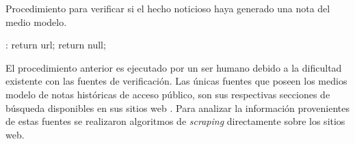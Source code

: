 \begin{algorithm}[H]
	\caption{Procedimiento para verificar si el hecho noticioso haya generado una nota del medio modelo.}
	\label{pchaveLink}
	\begin{algorithmic}[1]
		:
			\State return url;
		\Else
			\State return null;
		\EndIf
		\EndFunction
	\end{algorithmic}
\end{algorithm}	

El procedimiento anterior es ejecutado por un ser humano debido a la dificultad existente con las fuentes de verificación. Las únicas fuentes que poseen los medios modelo de notas históricas de acceso público, son sus respectivas secciones de búsqueda disponibles en sus sitios web \cite{busqueda24horas} \cite{busquedaBioBio} \cite{busquedaLaTercera}. Para analizar la información provenientes de estas fuentes se realizaron algoritmos de \emph{scraping} directamente sobre los sitios web.
